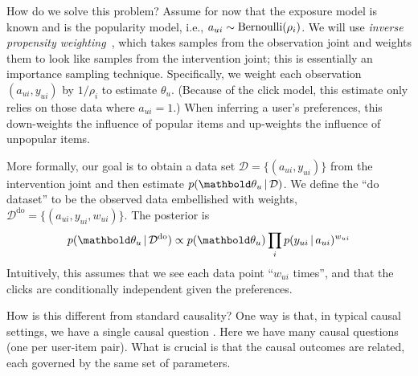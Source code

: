 How do we solve this problem?  Assume for now that the exposure model
is known and is the popularity model, i.e.,
$a_{ui} \sim \mathrm{Bernoulli}(\rho_i)$. We will use \textit{inverse propensity
  weighting}~\citep{imbens2015causal}, which takes samples from the
observation joint and weights them to look like samples from the
intervention joint; this is essentially an importance sampling
technique. Specifically, we weight each observation $(a_{ui}, y_{ui})$
by $1 / \rho_i$ to estimate $\theta_u$. (Because of the click model,
this estimate only relies on those data where $a_{ui} = 1$.) When
inferring a user's preferences, this down-weights the influence of
popular items and up-weights the influence of unpopular items.

More formally, our goal is to obtain a data set
$\mathcal{D} = \{(a_{ui}, y_{ui})\}$ from the intervention joint and
then estimate $p(\mb\theta_u \g \mathcal{D})$. We define the ``do
dataset'' to be the observed data embellished with weights,
$\mathcal{D}^{\textrm{do}} = \{(a_{ui}, y_{ui}, w_{ui})\}$. The
posterior is
\begin{align}
  p(\mb\theta_u \g \mathcal{D}^{\textrm{do}}) \propto
  p(\mb\theta_u) \prod_{i} p(y_{ui} \g a_{ui})^{w_{ui}}
  \label{eq:causal-training}
\end{align}
Intuitively, this assumes that we see each data point ``$w_{ui}$
times'', and that the clicks are conditionally independent given the
preferences.


How is this different from standard causality?  One way is that, in
typical causal settings, we have a single causal question \citep{imbens2015causal}.  Here we
have many causal questions (one per user-item pair).  What is crucial is that
the causal outcomes are related, each governed by the same set of
parameters.




